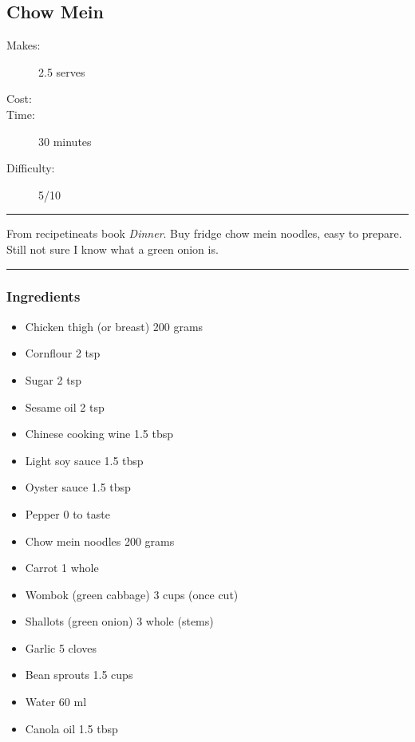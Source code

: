 \documentclass[]{article}
\begin{document}
\subsection*{\center\huge Chow Mein}
\begin{description}
\item[Makes:] 2.5 serves
\item[Cost:] \textdollar
\item[Time:] 30 minutes
\item[Difficulty:] 5/10
\end{description}
\vspace{0.2cm}\hrule\vspace{0.5cm}
\begin{adjustwidth}{0.5 cm}{0.5 cm}

From recipetineats book \textit{Dinner}. Buy fridge chow mein noodles, easy to prepare. Still not sure I know what a green onion is. \hfill{}\color{black}

\end{adjustwidth}
\vspace{0.5cm}\hrule
\subsubsection*{\Large Ingredients}
\begin{multicols}{2}
\begin{itemize}
 \item Chicken thigh (or breast) \hfill 200 grams
 \item Cornflour \hfill 2 tsp
 \item Sugar \hfill 2 tsp
 \item Sesame oil \hfill 2 tsp
 \item Chinese cooking wine \hfill 1.5 tbsp
 \item Light soy sauce \hfill 1.5 tbsp
 \item Oyster sauce \hfill 1.5 tbsp
 \item Pepper \hfill 0 to taste
 \item Chow mein noodles \hfill 200 grams
 \item Carrot \hfill 1 whole
 \item Wombok (green cabbage) \hfill 3 cups (once cut)
 \item Shallots (green onion) \hfill 3 whole (stems)
 \item Garlic \hfill 5 cloves
 \item Bean sprouts \hfill 1.5 cups
 \item Water \hfill 60 ml
 \item Canola oil \hfill 1.5 tbsp
\end{itemize}
\end{multicols}
\end{document}
